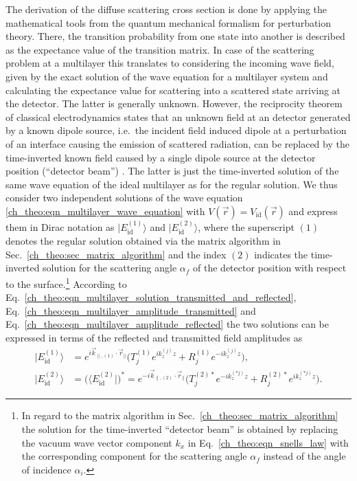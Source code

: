 The derivation of the diffuse scattering cross section is done by applying the mathematical tools from the quantum mechanical formalism for perturbation theory. There, the transition probability from one state into another is described as the expectance value of the transition matrix. In case of the scattering problem at a multilayer this translates to considering the incoming wave field, given by the exact solution of the wave equation for a multilayer system and calculating the expectance value for scattering into a scattered state arriving at the detector. The latter is generally unknown. However, the reciprocity theorem \cite{lorentz_theorem_1896, l._d._landau_electrodynamics_1960} of classical electrodynamics states that an unknown field at an detector generated by a known dipole source, i.e.~the incident field induced dipole at a perturbation of an interface causing the emission of scattered radiation, can be replaced by the time-inverted known field caused by a single dipole source at the detector position (``detector beam'') \cite{sinha_x-ray_1988, holy_nonspecular_1994, daillant_diffuse_2009}. The latter is just the time-inverted solution of the same wave equation of the ideal multilayer as for the regular solution. We thus consider two independent solutions of the wave equation \eqref{ch_theo:eqn_multilayer_wave_equation} with $V(\vec{r}) = V_\text{id}(\vec{r})$ and express them in Dirac notation \cite{dirac_new_1939} as $|E_{\text{id}}^{(1)}\rangle$ and $|E_{\text{id}}^{(2)}\rangle$, where the superscript $(1)$ denotes the regular solution obtained via the matrix algorithm in Sec.~\ref{ch_theo:sec_matrix_algorithm} and the index $(2)$ indicates the time-inverted solution for the scattering angle $\alpha_f$ of the detector position with respect to the surface.\footnote{In regard to the matrix algorithm in Sec.~\ref{ch_theo:sec_matrix_algorithm} the solution for the time-inverted ``detector beam'' is obtained by replacing the vacuum wave vector component $k_x$ in Eq.~\eqref{ch_theo:eqn_snells_law} with the corresponding component for the scattering angle $\alpha_f$ instead of the angle of incidence $\alpha_i$.} According to Eq.~\eqref{ch_theo:eqn_multilayer_solution_transmitted_and_reflected}, Eq.~\eqref{ch_theo:eqn_multilayer_amplitude_transmitted} and Eq.~\eqref{ch_theo:eqn_multilayer_amplitude_reflected} the two solutions can be expressed in terms of the reflected and transmitted field amplitudes as
\begin{align}
|E_{\text{id}}^{(1)}\rangle &= e^{i \vec{k}_{\parallel,(1)} \cdot \vec{r}_\parallel} \big(T_{j}^{(1)} e^{i k_z^{(j)} z} + R_{j}^{(1)} e^{-i k_z^{(j)} z}\big) \text{,} \label{ch_theo:eqn_regular_solution_ket}\\
|E_{\text{id}}^{(2)}\rangle &= \big(\langle E_{\text{id}}^{(2)}|\big)^* = e^{-i \vec{k}_{\parallel,(2)} \cdot \vec{r}_\parallel} \big(T_{j}^{(2)*} e^{-i k_z^{(*j)} z} + R_{j}^{(2)*} e^{i k_z^{(*j)} z}\big) \label{ch_theo:eqn_time_inverted_solution_ket} \text{.} 
\end{align}
